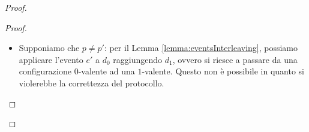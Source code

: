 \documentclass{article}
\newtheorem{lemma}{Lemma}
\begin{document}
\begin{proof}
\begin{proof}






\begin{itemize}
\item Supponiamo che $p \neq p'$: per il Lemma
  \ref{lemma:eventsInterleaving}, possiamo applicare l'evento $e'$ a
  $d_0$ raggiungendo $d_1$, ovvero si riesce a passare da una
  configurazione $0$-valente ad una $1$-valente. Questo non è
  possibile in quanto si violerebbe la correttezza del protocollo.


\end{itemize}
\end{proof}
\end{proof}
\end{document}
